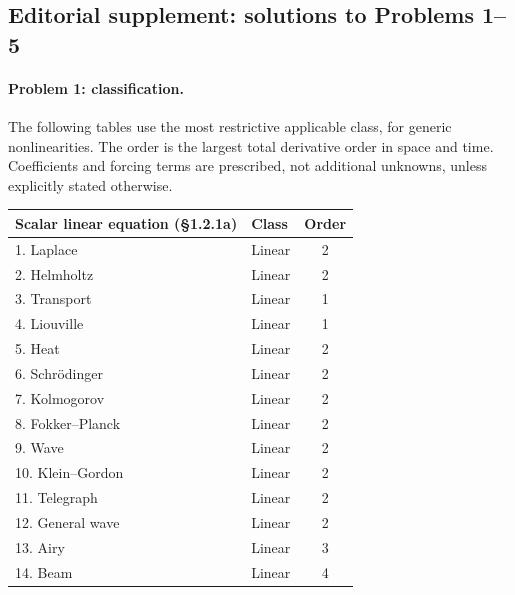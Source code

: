 \subsection*{Editorial supplement: solutions to Problems 1--5}
\paragraph{Problem 1: classification.}
The following tables use the most restrictive applicable class, for generic
nonlinearities. The order is the largest total derivative order in space
and time. Coefficients and forcing terms are prescribed, not additional
unknowns, unless explicitly stated otherwise.

\begin{center}\small
\begin{tabular}{@{}llc@{}}
\textbf{Scalar linear equation (\S1.2.1a)}&\textbf{Class}&\textbf{Order}\\\hline
1. Laplace & Linear & 2\\
2. Helmholtz & Linear & 2\\
3. Transport & Linear & 1\\
4. Liouville & Linear & 1\\
5. Heat & Linear & 2\\
6. Schrödinger & Linear & 2\\
7. Kolmogorov & Linear & 2\\
8. Fokker--Planck & Linear & 2\\
9. Wave & Linear & 2\\
10. Klein--Gordon & Linear & 2\\
11. Telegraph & Linear & 2\\
12. General wave & Linear & 2\\
13. Airy & Linear & 3\\
14. Beam & Linear & 4
\end{tabular}
\end{center}


